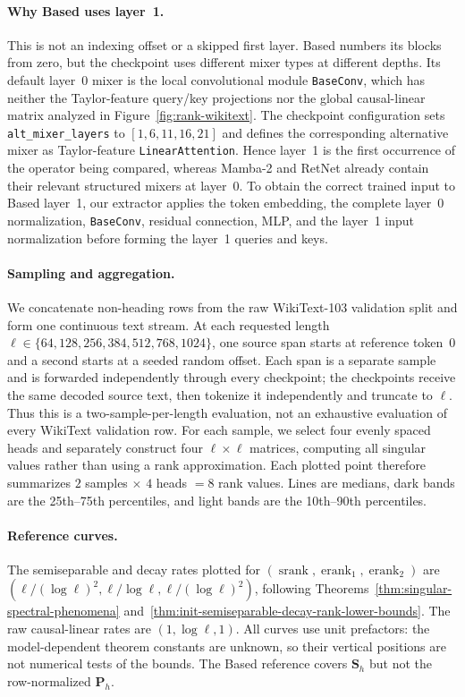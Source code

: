 \documentclass{article}
\newcommand{\srank}{\operatorname{srank}}
\newcommand{\erank}{\operatorname{erank}}
\newcommand{\bP}{\mathbf{P}}
\newcommand{\bS}{\mathbf{S}}
\theoremstyle{definition}
\theoremstyle{remark}
\begin{document}
\paragraph{Why Based uses layer~1.}
This is not an indexing offset or a skipped first layer.  Based numbers its
blocks from zero, but the checkpoint uses different mixer types at different
depths.  Its default layer~0 mixer is the local convolutional module
\texttt{BaseConv}, which has neither the Taylor-feature query/key projections
nor the global causal-linear matrix analyzed in Figure~\ref{fig:rank-wikitext}.
The checkpoint configuration sets
\texttt{alt\_mixer\_layers} to $[1,6,11,16,21]$ and defines the corresponding
alternative mixer as Taylor-feature \texttt{LinearAttention}.  Hence layer~1
is the first occurrence of the operator being compared, whereas Mamba-2 and
RetNet already contain their relevant structured mixers at layer~0.  To obtain
the correct trained input to Based layer~1, our extractor applies the token
embedding, the complete layer~0 normalization, \texttt{BaseConv}, residual
connection, MLP, and the layer~1 input normalization before forming the
layer~1 queries and keys.

\paragraph{Sampling and aggregation.}
We concatenate non-heading rows from the raw WikiText-103 validation split and
form one continuous text stream.  At each requested length
$\ell\in\{64,128,256,384,512,768,1024\}$, one source span starts at reference
token~0 and a second starts at a seeded random offset.  Each span is a separate
sample and is forwarded independently through every checkpoint; the
checkpoints receive the same decoded source text, then tokenize it independently
and truncate to $\ell$.  Thus this is a two-sample-per-length evaluation, not
an exhaustive evaluation of every WikiText validation row.  For each sample,
we select four evenly spaced heads and separately construct four
$\ell\times\ell$ matrices, computing all singular values rather than using a
rank approximation.  Each plotted point therefore summarizes $2$ samples
$\times$ $4$ heads $=8$ rank values.  Lines are medians, dark bands are the
25th--75th percentiles, and light bands are the 10th--90th percentiles.

\paragraph{Reference curves.}
The semiseparable and decay rates plotted for
$(\srank,\erank_1,\erank_2)$ are
$(\ell/(\log\ell)^2,\ell/\log\ell,\ell/(\log\ell)^2)$, following
Theorems~\ref{thm:singular-spectral-phenomena}
and~\ref{thm:init-semiseparable-decay-rank-lower-bounds}.  The raw
causal-linear rates are $(1,\log\ell,1)$.  All curves use unit prefactors:
the model-dependent theorem constants are unknown, so their vertical
positions are not numerical tests of the bounds.  The Based reference covers
$\bS_h$ but not the row-normalized $\bP_h$.
\end{document}
